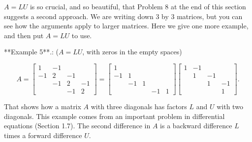 \(A=LU\) is so crucial, and so beautiful, that Problem 8 at the end of this section suggests a second approach. We are writing down 3 by 3 matrices, but you can see how the arguments apply to larger matrices. Here we give one more example, and then put \(A=LU\) to use.

**Example 5**.: (\(A=LU\), with zeros in the empty spaces)

\[A=\begin{bmatrix}1&-1&\\ -1&2&-1&\\ &-1&2&-1\\ &&-1&2\end{bmatrix}=\begin{bmatrix}1&&&\\ -1&1&&\\ &-1&1&\\ &&&-1&1\end{bmatrix}\begin{bmatrix}1&-1&&\\ &1&-1&\\ &&1&-1\\ &&&1\end{bmatrix}.\]

That shows how a matrix \(A\) with three diagonals has factors \(L\) and \(U\) with two diagonals. This example comes from an important problem in differential equations (Section 1.7). The second difference in \(A\) is a backward difference \(L\) times a forward difference \(U\).

 